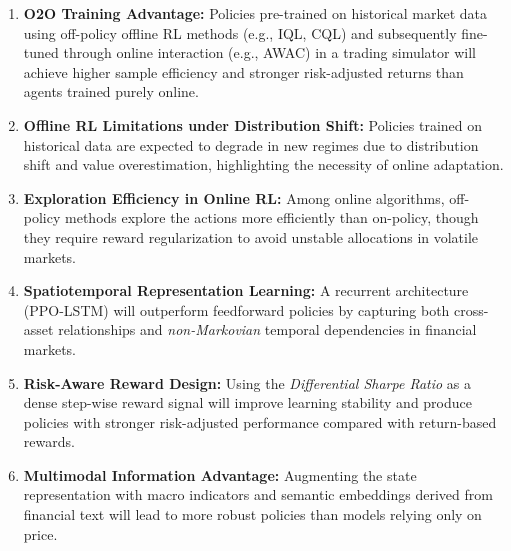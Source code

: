 \documentclass[10pt]{article}
\begin{document}
\begin{enumerate}[noitemsep, topsep=3pt]

\item \textbf{O2O Training Advantage:} Policies pre-trained on historical market data using off-policy offline RL methods (e.g., IQL, CQL) and subsequently fine-tuned through online interaction (e.g., AWAC) in a trading simulator will achieve higher sample efficiency and stronger risk-adjusted returns than agents trained purely online.

\item \textbf{Offline RL Limitations under Distribution Shift:}  
Policies trained on historical data are expected to degrade in new regimes due to distribution shift and value overestimation, highlighting the necessity of online adaptation.

\item \textbf{Exploration Efficiency in Online RL:}  
Among online algorithms, off-policy methods explore the actions more efficiently than on-policy, though they require reward regularization to avoid unstable allocations in volatile markets.

\item \textbf{Spatiotemporal Representation Learning:}  
A recurrent architecture (PPO-LSTM) will outperform feedforward policies by capturing both cross-asset relationships and \textit{non-Markovian} temporal dependencies in financial markets.

\item \textbf{Risk-Aware Reward Design:}  
Using the \textit{Differential Sharpe Ratio} as a dense step-wise reward signal will improve learning stability and produce policies with stronger risk-adjusted performance compared with return-based rewards.

\item \textbf{Multimodal Information Advantage:}  
Augmenting the state representation with macro indicators and semantic embeddings derived from financial text will lead to more robust policies than models relying only on price.%

\end{enumerate}
\end{document}
